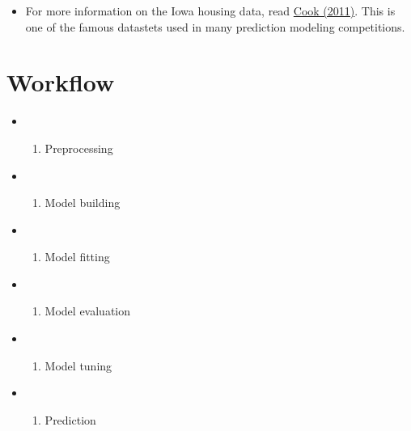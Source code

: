 \documentclass[
]{book}
\providecommand{\tightlist}{%
  \setlength{\itemsep}{0pt}\setlength{\parskip}{0pt}}
\begin{document}
\begin{itemize}
\tightlist
\item
  For more information on the Iowa housing data, read \href{http://jse.amstat.org/v19n3/decock.pdf}{Cook (2011)}. This is one of the famous datastets used in many prediction modeling competitions.
\end{itemize}

\hypertarget{workflow-3}{%
\section{Workflow}\label{workflow-3}}

\begin{itemize}
\item
  \begin{enumerate}
  \def\labelenumi{\arabic{enumi}.}
  \tightlist
  \item
    Preprocessing
  \end{enumerate}
\item
  \begin{enumerate}
  \def\labelenumi{\arabic{enumi}.}
  \setcounter{enumi}{1}
  \tightlist
  \item
    Model building
  \end{enumerate}
\item
  \begin{enumerate}
  \def\labelenumi{\arabic{enumi}.}
  \setcounter{enumi}{2}
  \tightlist
  \item
    Model fitting
  \end{enumerate}
\item
  \begin{enumerate}
  \def\labelenumi{\arabic{enumi}.}
  \setcounter{enumi}{3}
  \tightlist
  \item
    Model evaluation
  \end{enumerate}
\item
  \begin{enumerate}
  \def\labelenumi{\arabic{enumi}.}
  \setcounter{enumi}{4}
  \tightlist
  \item
    Model tuning
  \end{enumerate}
\item
  \begin{enumerate}
  \def\labelenumi{\arabic{enumi}.}
  \setcounter{enumi}{5}
  \tightlist
  \item
    Prediction
  \end{enumerate}
\end{itemize}
\end{document}
